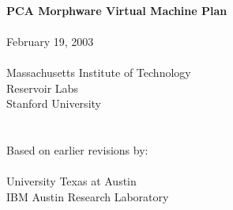 \documentclass[10pt]{article}
\begin{document}
  \begin{titlepage}
    \begin{center}
      {\LARGE
	~ \\ ~ \\ ~ \\ ~ \\ ~ \\ ~ \\ ~ \\ ~ \\
	{\bf PCA Morphware Virtual Machine Plan \\ ~ \\}
      }
      {\Large
	February 19, 2003 \\ ~ \\
      }
      {\large
	Massachusetts Institute of Technology \\ Reservoir Labs \\ Stanford University \\ ~ \\ ~ \\ 
	Based on earlier revisions by: \\ ~ \vspace{-8pt} \\
	University Texas at Austin \\ IBM Austin Research Laboratory
      }
    \end{center}
  \end{titlepage}

  \newcommand{\mt}[1]{\mbox{\it #1}}
  \newcommand{\todo}[1]{\framebox{\bf #1}}
  \newcommand{\sss}[1]{\medskip \noindent {\bf #1} \smallskip}
  \newcommand{\ssss}[1]{\medskip \noindent {\bf #1:}}

  \tableofcontents


\end{document}
